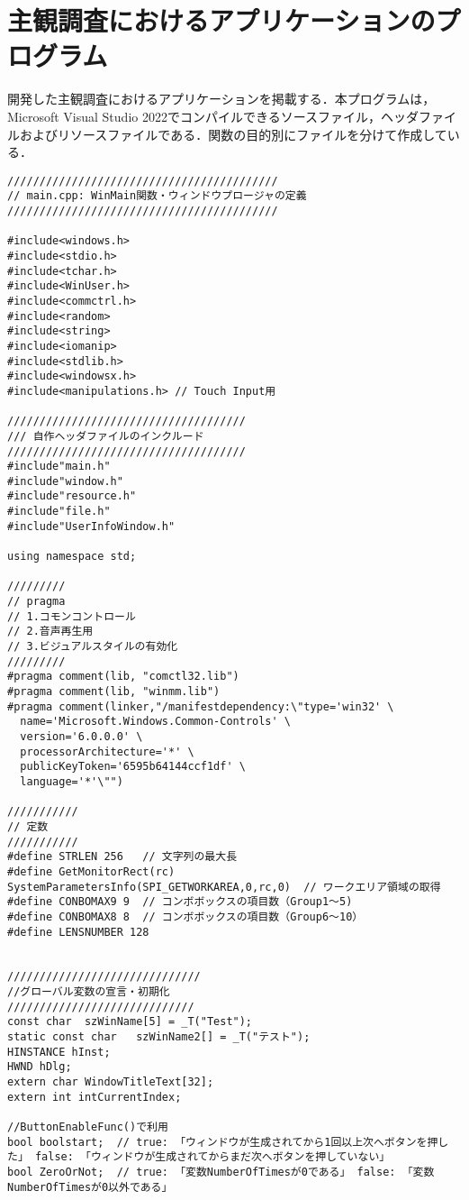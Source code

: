 \chapter{主観調査におけるアプリケーションのプログラム}
開発した主観調査におけるアプリケーションを掲載する．本プログラムは，Microsoft Visual Studio 2022でコンパイルできるソースファイル，ヘッダファイルおよびリソースファイルである．関数の目的別にファイルを分けて作成している．

\begin{lstlisting}[caption=main.cpp]
//////////////////////////////////////////
// main.cpp: WinMain関数・ウィンドウプロージャの定義
//////////////////////////////////////////

#include<windows.h>
#include<stdio.h>
#include<tchar.h>
#include<WinUser.h>
#include<commctrl.h> 
#include<random>
#include<string>
#include<iomanip>
#include<stdlib.h>
#include<windowsx.h>
#include<manipulations.h> // Touch Input用

/////////////////////////////////////
/// 自作ヘッダファイルのインクルード
/////////////////////////////////////
#include"main.h"
#include"window.h"
#include"resource.h"
#include"file.h"
#include"UserInfoWindow.h"

using namespace std;

/////////
// pragma
// 1.コモンコントロール
// 2.音声再生用
// 3.ビジュアルスタイルの有効化
/////////
#pragma comment(lib, "comctl32.lib")
#pragma comment(lib, "winmm.lib")
#pragma comment(linker,"/manifestdependency:\"type='win32' \
  name='Microsoft.Windows.Common-Controls' \
  version='6.0.0.0' \
  processorArchitecture='*' \
  publicKeyToken='6595b64144ccf1df' \
  language='*'\"") 

///////////
// 定数
///////////
#define STRLEN 256   // 文字列の最大長
#define GetMonitorRect(rc)  SystemParametersInfo(SPI_GETWORKAREA,0,rc,0)  // ワークエリア領域の取得
#define CONBOMAX9 9  // コンボボックスの項目数（Group1～5)
#define CONBOMAX8 8  // コンボボックスの項目数（Group6～10）
#define LENSNUMBER 128


//////////////////////////////
//グローバル変数の宣言・初期化
/////////////////////////////
const char	szWinName[5] = _T("Test");
static const char   szWinName2[] = _T("テスト");
HINSTANCE hInst;
HWND hDlg;
extern char WindowTitleText[32];
extern int intCurrentIndex;

//ButtonEnableFunc()で利用
bool boolstart;  // true: 「ウィンドウが生成されてから1回以上次へボタンを押した」 false: 「ウィンドウが生成されてからまだ次へボタンを押していない」
bool ZeroOrNot;  // true: 「変数NumberOfTimesが0である」 false: 「変数NumberOfTimesが0以外である」


\end{lstlisting}
